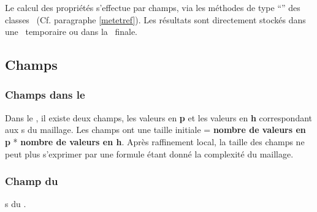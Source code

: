       Le calcul des propriétés s'effectue par champs, via les méthodes de type ``'' des classes \EOS\ (Cf. paragraphe \ref{metetref}). 
      Les résultats sont directement stockés dans une \bdd\ temporaire ou dans la \bdd\ finale.
      
      \subsection{Champs}
       \subsubsection{Champs dans le \pph}
       Dans le \pph, il existe deux champs, les valeurs en \textbf{p} et les 
       valeurs en \textbf{h} correspondant aux \n s du maillage. Les champs ont une taille 
       initiale = \textbf{nombre de valeurs en p} * \textbf{nombre de valeurs en h}.
       Après raffinement local, la taille des champs ne peut plus s'exprimer par une formule étant donné la complexité du maillage.
       
       \subsubsection{Champ du \sgp} 
       \n s du \sgp.
       

